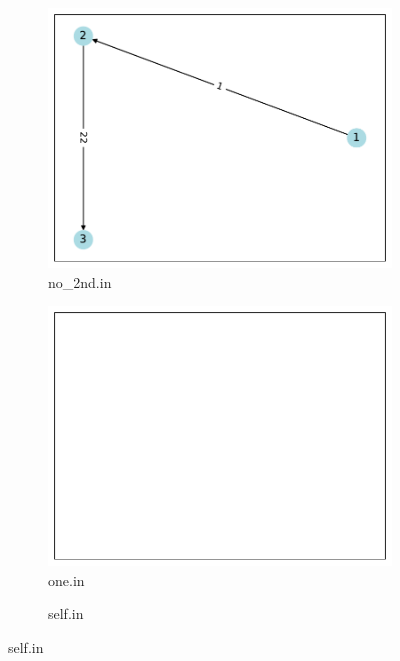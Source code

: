 \documentclass[a4paper,oneside]{book}
\begin{document}
\begin{figure}[!ht]
\begin{subfigure}[b]{0.3\textwidth}
        \caption{no\_2nd.in}
        \includegraphics[width=\textwidth]{src/no_2nd.pdf}
    \end{subfigure}
    \begin{subfigure}[b]{0.3\textwidth}
        \centering
        \caption{one.in}
        \includegraphics[width=\textwidth]{src/one.pdf}
    \end{subfigure}
    \begin{subfigure}[b]{0.3\textwidth}
        \centering
        \caption{self.in}

\end{subfigure}
\end{figure}
\end{document}
